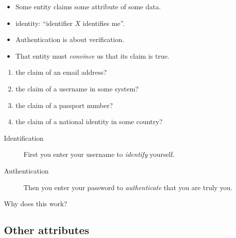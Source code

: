 \begin{frame}
  \begin{definition}[Authentication]
    \begin{itemize}
      \item Some entity claims some attribute of some data.
      \item \Eg identity: \enquote{identifier \(X\) identifies me}.
      \item Authentication is about verification.
      \item That entity must \emph{convince} us that its claim is true.
    \end{itemize}
  \end{definition}

  \pause{}

  \begin{exercise}
    \begin{enumerate}
      \item the claim of an email address?
      \item the claim of a username in some system?
      \item the claim of a passport number?
      \item the claim of a national identity in some country?
    \end{enumerate}
  \end{exercise}
\end{frame}

\begin{frame}
  \begin{example}
    \begin{description}
      \item[Identification] First you enter your username to \emph{identify} 
        yourself.

      \item[Authentication] Then you enter your password to \emph{authenticate} 
        that you are truly you.
    \end{description}
  \end{example}

  \pause{}

  \begin{exercise}
    Why does this work?
  \end{exercise}
\end{frame}

\subsection{Other attributes}

